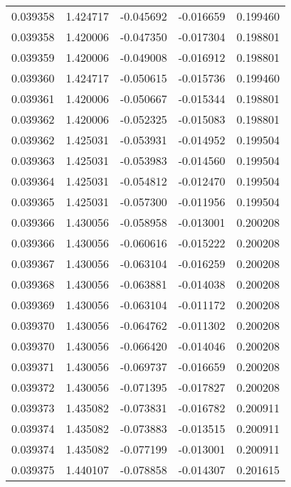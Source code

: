 \begin{tabular}{lrrrr}
0.039358    &  1.424717 & -0.045692 & -0.016659 &             0.199460 \\
0.039358    &  1.420006 & -0.047350 & -0.017304 &             0.198801 \\
0.039359    &  1.420006 & -0.049008 & -0.016912 &             0.198801 \\
0.039360    &  1.424717 & -0.050615 & -0.015736 &             0.199460 \\
0.039361    &  1.420006 & -0.050667 & -0.015344 &             0.198801 \\
0.039362    &  1.420006 & -0.052325 & -0.015083 &             0.198801 \\
0.039362    &  1.425031 & -0.053931 & -0.014952 &             0.199504 \\
0.039363    &  1.425031 & -0.053983 & -0.014560 &             0.199504 \\
0.039364    &  1.425031 & -0.054812 & -0.012470 &             0.199504 \\
0.039365    &  1.425031 & -0.057300 & -0.011956 &             0.199504 \\
0.039366    &  1.430056 & -0.058958 & -0.013001 &             0.200208 \\
0.039366    &  1.430056 & -0.060616 & -0.015222 &             0.200208 \\
0.039367    &  1.430056 & -0.063104 & -0.016259 &             0.200208 \\
0.039368    &  1.430056 & -0.063881 & -0.014038 &             0.200208 \\
0.039369    &  1.430056 & -0.063104 & -0.011172 &             0.200208 \\
0.039370    &  1.430056 & -0.064762 & -0.011302 &             0.200208 \\
0.039370    &  1.430056 & -0.066420 & -0.014046 &             0.200208 \\
0.039371    &  1.430056 & -0.069737 & -0.016659 &             0.200208 \\
0.039372    &  1.430056 & -0.071395 & -0.017827 &             0.200208 \\
0.039373    &  1.435082 & -0.073831 & -0.016782 &             0.200911 \\
0.039374    &  1.435082 & -0.073883 & -0.013515 &             0.200911 \\
0.039374    &  1.435082 & -0.077199 & -0.013001 &             0.200911 \\
0.039375    &  1.440107 & -0.078858 & -0.014307 &             0.201615 \\

\end{tabular}
